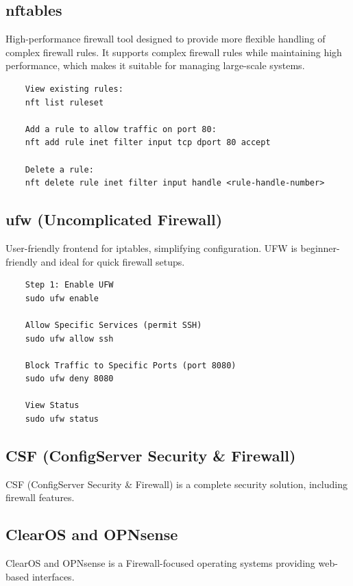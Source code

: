 \subsection{nftables}
High-performance firewall tool designed to provide more flexible handling of complex firewall rules.
It supports complex firewall rules while maintaining high performance, which makes it suitable for managing large-scale systems.
\begin{lstlisting} 
    View existing rules:
    nft list ruleset
    
    Add a rule to allow traffic on port 80:
    nft add rule inet filter input tcp dport 80 accept
    
    Delete a rule:
    nft delete rule inet filter input handle <rule-handle-number>
\end{lstlisting} 

\subsection{ufw (Uncomplicated Firewall)}
User-friendly frontend for iptables, simplifying configuration.
UFW is beginner-friendly and ideal for quick firewall setups. 
\begin{lstlisting} 
    Step 1: Enable UFW
    sudo ufw enable

    Allow Specific Services (permit SSH)
    sudo ufw allow ssh

    Block Traffic to Specific Ports (port 8080)
    sudo ufw deny 8080

    View Status
    sudo ufw status
\end{lstlisting} 


\subsection{CSF (ConfigServer Security \& Firewall)}
CSF (ConfigServer Security \& Firewall) is a complete security solution, including firewall features.  

\subsection{ClearOS and OPNsense}
ClearOS and OPNsense is a Firewall-focused operating systems providing web-based interfaces.  

